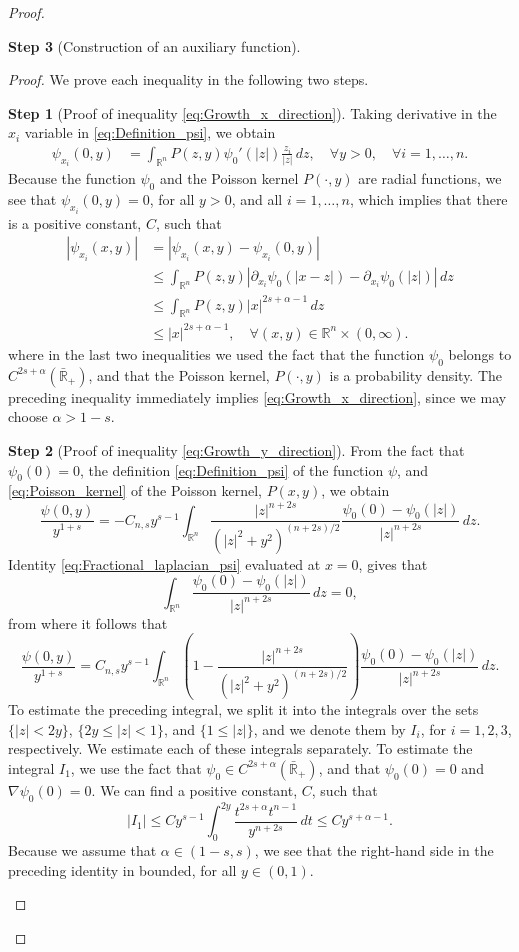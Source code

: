 \documentclass[11pt,reqno]{amsart}
\theoremstyle{definition}
\newtheorem{step}{Step}
\theoremstyle{remark}
\begin{document}
\begin{proof}
\begin{step}[Construction of an auxiliary function]
\begin{proof}
We prove each inequality in the following two steps.
\setcounter{step}{0}
\begin{step}[Proof of inequality \eqref{eq:Growth_x_direction}]
Taking derivative in the $x_i$ variable in \eqref{eq:Definition_psi}, we obtain
\begin{align*}
\psi_{x_i}(0,y)&=\int_{{\mathbb{R}}^n} P(z,y) \psi_0'(|z|) \frac{z_i}{|z|}\, dz,\quad\forall y>0,\quad \forall i=1,\ldots,n.
\end{align*}
Because the function $\psi_0$ and the Poisson kernel $P(\cdot,y)$ are radial functions, we see that $\psi_{x_i}(0,y) =0$, for all $y>0$, and all $i=1,\ldots,n$, which implies that there is a positive constant, $C$, such that
\begin{align*}
|\psi_{x_i}(x,y)| &= |\psi_{x_i}(x,y)- \psi_{x_i}(0,y)|\\
&\leq\int_{{\mathbb{R}}^n} P(z,y)|\partial_{x_i}\psi_0(|x-z|)-\partial_{x_i}\psi_0(|z|)|\, dz\\
&\leq\int_{{\mathbb{R}}^n} P(z,y)|x|^{2s+\alpha-1}\, dz\\
&\leq |x|^{2s+\alpha-1},\quad\forall (x,y)\in{\mathbb{R}}^{n}\times(0,\infty).
\end{align*}
where in the last two inequalities we used the fact that the function $\psi_0$ belongs to $C^{2s+\alpha}(\bar{\mathbb{R}}_+)$, and that the Poisson kernel, $P(\cdot,y)$ is a probability density. The preceding inequality immediately implies \eqref{eq:Growth_x_direction}, since we may choose $\alpha>1-s$. 
\end{step}

\begin{step}[Proof of inequality \eqref{eq:Growth_y_direction}]
From the fact that $\psi_0(0)=0$, the definition \eqref{eq:Definition_psi} of the function $\psi$, and \eqref{eq:Poisson_kernel} of the Poisson kernel, $P(x,y)$, we obtain
$$
\frac{\psi(0,y)}{y^{1+s}} = -C_{n,s} y^{s-1}\int_{{\mathbb{R}}^n} \frac{|z|^{n+2s}}{\left(|z|^2+y^2\right)^{(n+2s)/2}} \frac{\psi_0(0)-\psi_0(|z|)}{|z|^{n+2s}}\, dz.
$$
Identity \eqref{eq:Fractional_laplacian_psi} evaluated at $x=0$, gives that
$$
\int_{{\mathbb{R}}^n} \frac{\psi_0(0)-\psi_0(|z|)}{|z|^{n+2s}}\, dz=0,
$$
from where it follows that
$$
\frac{\psi(0,y)}{y^{1+s}} = C_{n,s} y^{s-1}\int_{{\mathbb{R}}^n}\left(1- \frac{|z|^{n+2s}}{\left(|z|^2+y^2\right)^{(n+2s)/2}}\right) \frac{\psi_0(0)-\psi_0(|z|)}{|z|^{n+2s}}\, dz.
$$
To estimate the preceding integral, we split it into the integrals over the sets $\{|z|<2y\}$, $\{2y\leq |z|<1\}$, and $\{1\leq |z|\}$, and we denote them by $I_i$, for $i=1,2,3$, respectively. We estimate each of these integrals separately. To estimate the integral $I_1$, we use the fact that $\psi_0\in C^{2s+\alpha}(\bar{\mathbb{R}}_+)$, and that $\psi_0(0)=0$ and $\nabla\psi_0(0)=0$. We can find a positive constant, $C$, such that
$$
|I_1| \leq C y^{s-1} \int_0^{2y} \frac{t^{2s+\alpha}t^{n-1}}{y^{n+2s}}\, dt\leq C y^{s+\alpha-1}.
$$
Because we assume that $\alpha\in (1-s,s)$, we see that the right-hand side in the preceding identity in bounded, for all $y\in (0,1)$.


\end{step}
\end{proof}
\end{step}
\end{proof}
\end{document}
